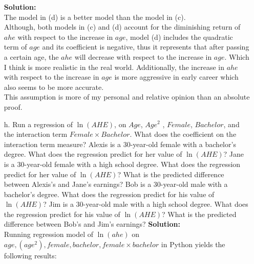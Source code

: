 \documentclass{uofa-eng-assignment}
\begin{document}
\begin{enumerate}
        \textbf{Solution:} \\ The model in (d) is a better model than the model in (c).
        \\ Although, both models in (c) and (d) account for the diminishing return of
        $ahe$ with respect to the increase in $age$, model (d) includes the quadratic
        term of $age$ and its coefficient is negative, thus it represents that after
        passing a certain age, the $ahe$ will decrease with respect to the increase in
        $age$. Which I think is more realistic in the real world. Additionally, the
        increase in $ahe$ with respect to the increase in $age$ is more aggressive in
        early career which also seems to be more accurate. \\ This assumption is more
        of my personal and relative opinion than an absolute proof.
    \item [h.] Run a regression of $\ln{(AHE)}$, on $Age$, $Age^2$ , $Female$, $Bachelor$, and the interaction term
          $Female\times Bachelor$. What does the coefficient on the interaction term measure? Alexis is
          a 30-year-old female with a bachelor's degree. What does the regression predict for her
          value of $\ln{(AHE)}$? Jane is a 30-year-old female with a high school degree. What does
          the regression predict for her value of $\ln{(AHE)}$? What is the predicted difference
          between Alexis's and Jane's earnings? Bob is a 30-year-old male with a bachelor's
          degree. What does the regression predict for his value of $\ln{(AHE)}$? Jim is a 30-year-old
          male with a high school degree. What does the regression predict for his value of
          $\ln{(AHE)}$? What is the predicted difference between Bob's and Jim's earnings? \newpage
          \textbf{Solution:} \\
          Running regression model of $\ln{(ahe)}$ on $age, (age^2), female, bachelor, female \times bachelor$ in Python yields the following results:

\end{enumerate}
\end{document}
